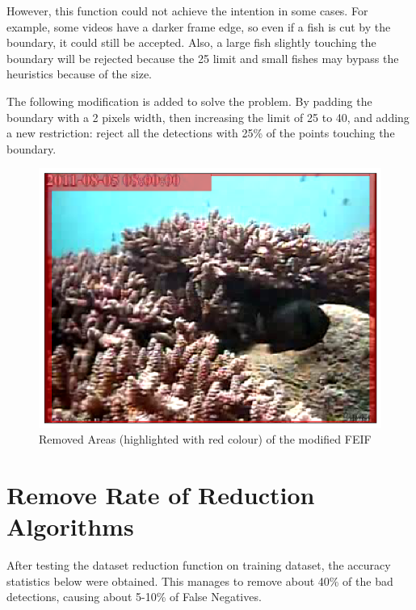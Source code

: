 \documentclass[bsc,logo,twoside,fullspacing,parskip]{infthesis}
\begin{document}
However, this function could not achieve the intention in some cases. 
For example, some videos have a darker frame edge, so even if a fish is cut by the boundary, it could still be accepted. 
Also, a large fish slightly touching the boundary will be rejected because the 25 limit and small fishes may bypass the heuristics because of the size.

The following modification is added to solve the problem.
By padding the boundary with a 2 pixels width, then increasing the limit of 25 to 40, and adding a new restriction: reject all the detections with 25\% of the points touching the boundary. %

\begin{figure}[h]
\centering
    \includegraphics[scale=0.24]{graph/feifzone.png}
    \caption{Removed Areas (highlighted with red colour) of the modified FEIF}
    \label{fig:feifzone}
\end{figure}

\vspace{-15pt}

\section{Remove Rate of Reduction Algorithms}
\label{sec:reduction}


After testing the dataset reduction function on training dataset, the accuracy statistics below were obtained. This manages to remove about 40\% of the bad detections, causing about 5-10\% of False Negatives. 
\end{document}
